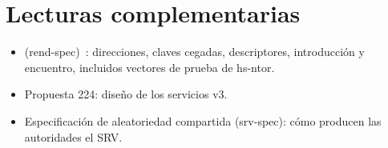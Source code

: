 \section*{Lecturas complementarias}
\begin{itemize}
  \item {} (rend-spec)~\cite{torspec}: direcciones, claves cegadas, descriptores, introducción y encuentro, incluidos vectores de prueba de hs-ntor.
  \item Propuesta 224: diseño de los servicios v3.
  \item Especificación de aleatoriedad compartida (srv-spec): cómo producen las autoridades el SRV.
\end{itemize}
